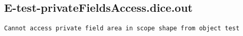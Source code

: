 \subsection{E-test-privateFieldsAccess.dice.out}
\begin{verbatim}
Cannot access private field area in scope shape from object test

\end{verbatim}